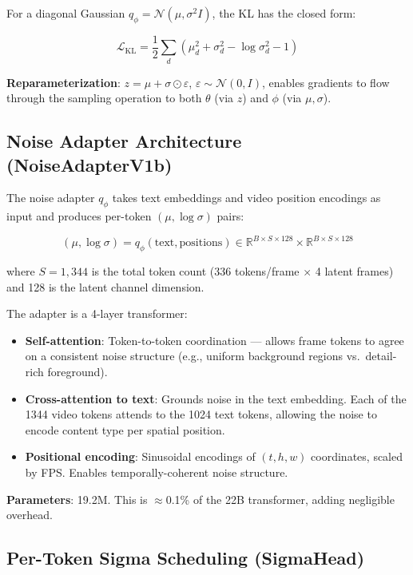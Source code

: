\documentclass[10pt,twocolumn]{article}
\begin{document}
For a diagonal Gaussian $q_\phi = \mathcal{N}(\mu, \sigma^2 I)$, the KL has the closed form:

\begin{equation}
  \mathcal{L}_{\text{KL}} = \frac{1}{2}\sum_d \left(\mu_d^2 + \sigma_d^2 - \log\sigma_d^2 - 1\right)
\end{equation}

\textbf{Reparameterization}: $z = \mu + \sigma \odot \varepsilon$, $\varepsilon \sim \mathcal{N}(0,I)$, enables gradients to flow through the sampling operation to both $\theta$ (via $z$) and $\phi$ (via $\mu, \sigma$).

\subsection{Noise Adapter Architecture (NoiseAdapterV1b)}

The noise adapter $q_\phi$ takes text embeddings and video position encodings as input and produces per-token $(\mu, \log\sigma)$ pairs:

\begin{equation}
  (\mu, \log\sigma) = q_\phi(\text{text}, \text{positions}) \in \mathbb{R}^{B \times S \times 128} \times \mathbb{R}^{B \times S \times 128}
\end{equation}

where $S = 1{,}344$ is the total token count (336 tokens/frame $\times$ 4 latent frames) and 128 is the latent channel dimension.

The adapter is a 4-layer transformer:
\begin{itemize}[nosep]
  \item \textbf{Self-attention}: Token-to-token coordination — allows frame tokens to agree on a consistent noise structure (e.g., uniform background regions vs.\ detail-rich foreground).
  \item \textbf{Cross-attention to text}: Grounds noise in the text embedding. Each of the 1344 video tokens attends to the 1024 text tokens, allowing the noise to encode content type per spatial position.
  \item \textbf{Positional encoding}: Sinusoidal encodings of $(t, h, w)$ coordinates, scaled by FPS. Enables temporally-coherent noise structure.
\end{itemize}

\textbf{Parameters}: 19.2M. This is $\approx$0.1\% of the 22B transformer, adding negligible overhead.

\subsection{Per-Token Sigma Scheduling (SigmaHead)}
\end{document}

